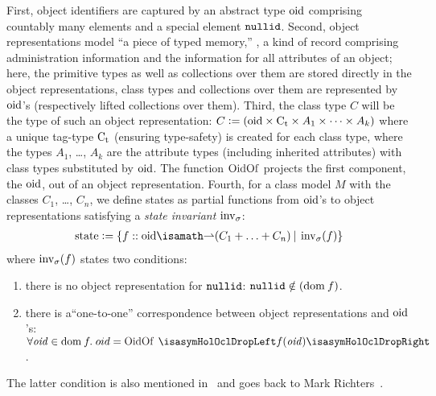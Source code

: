 First, object identifiers are captured by an abstract type $\mathrm{oid}$ comprising
countably many elements and a special element $\mathtt{nullid}$.
%
Second, object representations model ``a piece of typed memory,'' \ie, a kind of
record comprising administration information and the information for all
attributes of an object; here, the primitive types as well as collections over
them are stored directly in the object representations, class types and
collections over them are represented by $\mathrm{oid}$'s (respectively lifted
collections over them).
%
Third, the class type $C$ will be the type of such an object representation: $C
\mathrel{\mathop:}= (\mathrm{oid} \times \mathrm{C}_{\text{t}} \times A_1 \times \cdots \times A_k )$ where a
unique tag-type $\mathrm{C}_{\text{t}}$ (ensuring type-safety) is created for each class type,
where the types $A_1$, \ldots, $A_k$ are the attribute types (including
inherited attributes) with class types substituted by $\mathrm{oid}$. The function
$\HolOclOidOf$ projects the first component, the $\mathrm{oid}$, out of an object
representation.
%
Fourth,
for a  class model $M$ with the classes $C_1$, \ldots, $C_n$, we
define states as partial functions from $\mathrm{oid}$'s to object representations
satisfying a \emph{state invariant} $\operatorname{inv}_\sigma$:
\begin{gather*}
  \state{} \defeq \{ f :: \oid \isasymrightharpoonup (C_1 + \ldots +
  C_n) \ap|\ap \inv_\sigma(f) \}
\end{gather*}
where $\operatorname{inv}_\sigma(f)$ states two conditions:
\begin{enumerate}
\item there is no object representation for $\mathtt{nullid}$: $\mathtt{nullid} \notin (\mathrm{dom}\: f)$.
\item there is a``one-to-one'' correspondence between object representations and
  $\mathrm{oid}$'s: $\forall \mathit{oid} \in \dom\ap f\spot oid = \HolOclOidOf\ap
  \drop{f(\mathit{oid})}$.
\end{enumerate}
The latter condition is also mentioned in~\cite[Annex A]{omg:ocl:2003} and
goes back to Mark Richters~\cite{richters:precise:2002}.

